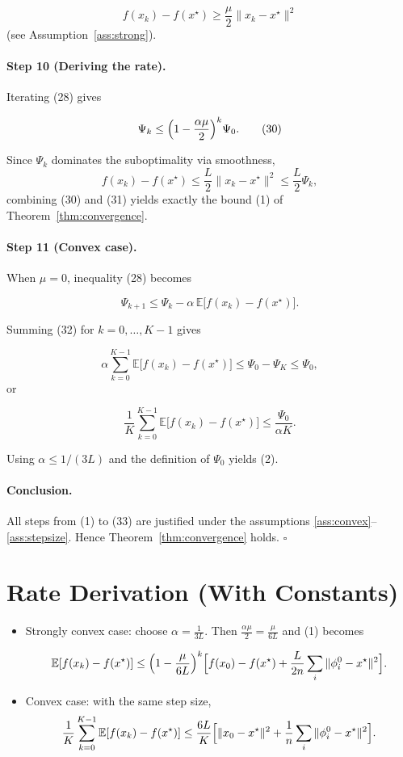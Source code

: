 \documentclass{article}
\newcommand{\E}{\mathbb{E}}
\begin{document}
\[
f(x_k)-f(x^{\star})\ge \frac{\mu}{2}\|x_k-x^{\star}\|^{2}
\tag{29}
\]
(see Assumption~\ref{ass:strong}).

\paragraph{Step 10 (Deriving the rate).}
Iterating (28) gives  

\[
\Psi_k\le\Bigl(1-\frac{\alpha\mu}{2}\Bigr)^{k}\Psi_0.
\tag{30}
\]

Since \(\Psi_k\) dominates the suboptimality via smoothness,
\[
f(x_k)-f(x^{\star})\le \frac{L}{2}\|x_k-x^{\star}\|^{2}
\le \frac{L}{2}\Psi_k,
\tag{31}
\]
combining (30) and (31) yields exactly the bound (1) of Theorem~\ref{thm:convergence}.

\paragraph{Step 11 (Convex case).}
When \(\mu=0\), inequality (28) becomes  

\[
\Psi_{k+1}\le\Psi_k-\alpha\,\E\!\bigl[f(x_k)-f(x^{\star})\bigr].
\tag{32}
\]

Summing (32) for \(k=0,\dots ,K-1\) gives  

\[
\alpha\sum_{k=0}^{K-1}\E\!\bigl[f(x_k)-f(x^{\star})\bigr]
\le\Psi_0-\Psi_{K}\le\Psi_0,
\]
or  

\[
\frac{1}{K}\sum_{k=0}^{K-1}\E\!\bigl[f(x_k)-f(x^{\star})\bigr]
\le\frac{\Psi_0}{\alpha K}.
\tag{33}
\]

Using \(\alpha\le 1/(3L)\) and the definition of \(\Psi_0\) yields (2).

\paragraph{Conclusion.}
All steps from (1) to (33) are justified under the assumptions
\ref{ass:convex}–\ref{ass:stepsize}. Hence Theorem~\ref{thm:convergence} holds.
\(\square\)

\section*{Rate Derivation (With Constants)}
\begin{itemize}
\item Strongly convex case: choose \(\alpha=\frac{1}{3L}\).  
Then \(\frac{\alpha\mu}{2}= \frac{\mu}{6L}\) and (1) becomes  

\[
\E[f(x_k)-f(x^{\star})]\le
\Bigl(1-\frac{\mu}{6L}\Bigr)^{k}
\Bigl[f(x_0)-f(x^{\star})+\frac{L}{2n}\sum_{i}\|\phi_i^{0}-x^{\star}\|^{2}\Bigr].
\]

\item Convex case: with the same step size,
\[
\frac{1}{K}\sum_{k=0}^{K-1}\E[f(x_k)-f(x^{\star})]
\le \frac{6L}{K}\Bigl[\|x_0-x^{\star}\|^{2}
   +\frac{1}{n}\sum_{i}\|\phi_i^{0}-x^{\star}\|^{2}\Bigr].
\]
\end{itemize}
\end{document}
